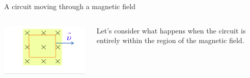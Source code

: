 \begin{frame}{A circuit moving through a magnetic field}

\begin{columns}
  \begin{column}{0.30\textwidth}
    \includegraphics[width=0.99\textwidth]{./images/schematics/circuit_moving_through_magnetic_field_centre.png}\\
  \end{column}
  \begin{column}{0.70\textwidth}
    Let's consider what happens when the circuit is entirely within the region of the magnetic field.
  \end{column}
\end{columns}

\vspace{0.1cm}


\end{frame}
